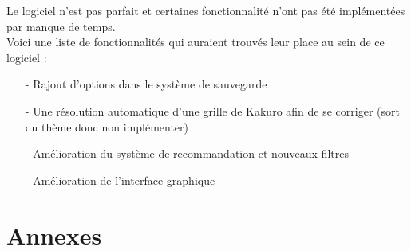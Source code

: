 \documentclass[french,12pt]{article}
\begin{document}
Le logiciel n'est pas parfait et certaines fonctionnalité n'ont pas été implémentées par manque de temps. \\
Voici une liste de fonctionnalités qui auraient trouvés leur place au sein de ce logiciel : \\

\begin{enumerate}
	\item[-] Rajout d'options dans le système de sauvegarde
	\item[-] Une résolution automatique d'une grille de Kakuro afin de se corriger (sort du thème donc non implémenter)
	\item[-] Amélioration du système de recommandation et nouveaux filtres
	\item[-] Amélioration de l'interface graphique
\end{enumerate}

\newpage
\section{Annexes}

\begin{figure}
	
\end{figure}
\end{document}
